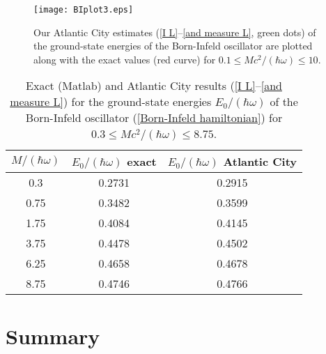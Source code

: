 \documentclass[prd,preprint,floatfix,showpacs]{revtex4-1}
\begin{document}
\begin{figure}[h]
\begin{center}
\texttt{[image: BIplot3.eps]}
\caption{Our Atlantic City  estimates 
(\ref{I L}--\ref{and measure L}, green dots)
of the ground-state energies of the 
Born-Infeld oscillator are plotted along 
with the exact values (red curve) for 
\( 0.1 \le Mc^2/(\hbar \omega) \le 10 \)\@.}
\label {very awkward Born-Infeld big masses}
\end{center}
\end{figure}

\par
\begin{table}[h]
\caption{Exact (Matlab) and 
Atlantic City  results 
(\ref {I L}--\ref{and measure L})
for the ground-state energies \( E_0/(\hbar \omega) \) 
of the Born-Infeld oscillator
(\ref{Born-Infeld hamiltonian})
for \( 0.3 \le Mc^2/(\hbar \omega) \le 8.75 \)\@.}
\begin{center}
\begin{tabular}{|c|c|c|}
\hline
\( M/(\hbar \omega) \)& \( E_0/(\hbar \omega) \) exact 
  & \(E_0/(\hbar \omega) \) Atlantic City   \\
\hline
0.3&0.2731&0.2915\\
\hline
0.75&0.3482&0.3599\\
\hline
1.75&0.4084&0.4145\\
\hline
3.75&0.4478&0.4502\\
\hline
6.25&0.4658&0.4678\\
\hline
8.75&0.4746&0.4766\\
\hline
\end{tabular}
\end{center}
\label {very awkward bigMasses}
\end{table}

\section{Summary
\label{Summary}}
\end{document}
